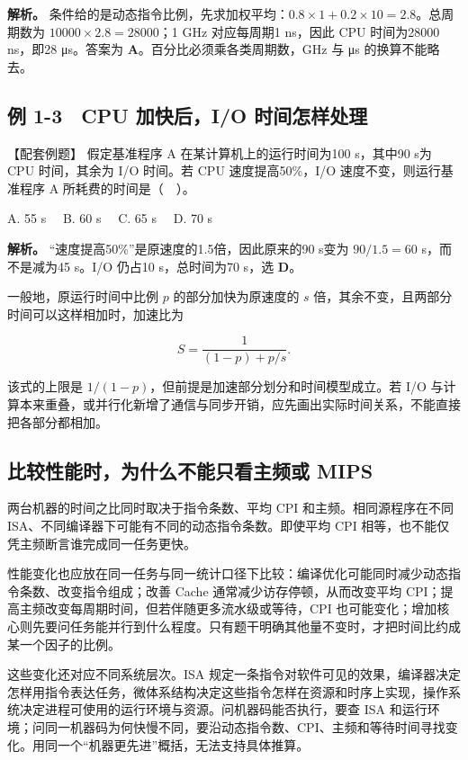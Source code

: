 \textbf{解析。} 条件给的是动态指令比例，先求加权平均：\(0.8\times1+0.2\times10=2.8\)。总周期数为 \(10000\times2.8=28000\)；1 GHz 对应每周期1 ns，因此 CPU 时间为28000 ns，即28 μs。答案为 \textbf{A}。百分比必须乘各类周期数，GHz 与 μs 的换算不能略去。

\subsection{例 1-3　CPU 加快后，I/O 时间怎样处理}\label{CO01-09}

\begin{example}[配套例题]

【配套例题】 假定基准程序 A 在某计算机上的运行时间为100 s，其中90 s为 CPU 时间，其余为 I/O 时间。若 CPU 速度提高50\%，I/O 速度不变，则运行基准程序 A 所耗费的时间是（　）。

A. 55 s　 B. 60 s　 C. 65 s　 D. 70 s

\end{example}

\textbf{解析。} ``速度提高50\%''是原速度的1.5倍，因此原来的90 s变为 \(90/1.5=60\) s，而不是减为45 s。I/O 仍占10 s，总时间为70 s，选 \textbf{D}。

一般地，原运行时间中比例 \(p\) 的部分加快为原速度的 \(s\) 倍，其余不变，且两部分时间可以这样相加时，加速比为

\[
S=\frac{1}{(1-p)+p/s}.
\]

该式的上限是 \(1/(1-p)\)，但前提是加速部分划分和时间模型成立。若 I/O 与计算本来重叠，或并行化新增了通信与同步开销，应先画出实际时间关系，不能直接把各部分都相加。

\subsection{比较性能时，为什么不能只看主频或 MIPS}\label{CO01-10}

两台机器的时间之比同时取决于指令条数、平均 CPI 和主频。相同源程序在不同 ISA、不同编译器下可能有不同的动态指令条数。即使平均 CPI 相等，也不能仅凭主频断言谁完成同一任务更快。

性能变化也应放在同一任务与同一统计口径下比较：编译优化可能同时减少动态指令条数、改变指令组成；改善 Cache 通常减少访存停顿，从而改变平均 CPI；提高主频改变每周期时间，但若伴随更多流水级或等待，CPI 也可能变化；增加核心则先要问任务能并行到什么程度。只有题干明确其他量不变时，才把时间比约成某一个因子的比例。

这些变化还对应不同系统层次。ISA 规定一条指令对软件可见的效果，编译器决定怎样用指令表达任务，微体系结构决定这些指令怎样在资源和时序上实现，操作系统决定进程可使用的运行环境与资源。问机器码能否执行，要查 ISA 和运行环境；问同一机器码为何快慢不同，要沿动态指令数、CPI、主频和等待时间寻找变化。用同一个``机器更先进''概括，无法支持具体推算。

